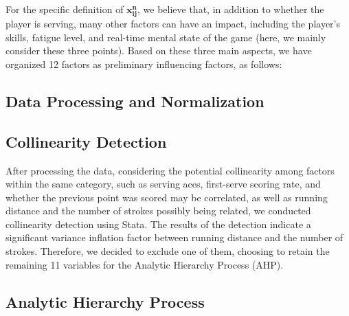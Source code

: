 \documentclass[12pt, a4paper, oneside]{article}
\theoremstyle{break}
\begin{document}

For the specific definition of $\boldsymbol{x_{ij}^{n}}$, we believe that, 
in addition to whether the player is serving, many other factors can have an impact,
including the player's skills, fatigue level, and real-time mental state of the game
(here, we mainly consider these three points). Based on these three main aspects, 
we have organized 12 factors as preliminary influencing factors, as follows:


\subsection{Data Processing and Normalization}



\subsection{Collinearity Detection}

After processing the data, considering the potential collinearity among factors within the same category, such as serving aces, first-serve scoring rate, and whether the previous point was scored may be correlated, as well as running distance and the number of strokes possibly being related, we conducted collinearity detection using Stata. The results of the detection indicate a significant variance inflation factor between running distance and the number of strokes. Therefore, we decided to exclude one of them, choosing to retain the remaining 11 variables for the Analytic Hierarchy Process (AHP).


\subsection{Analytic Hierarchy Process}
\end{document}
